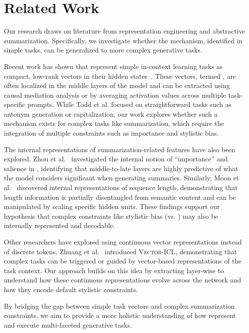 \section{Related Work}
\label{sec:related_work}

Our research draws on literature from representation engineering and abstractive summarization. Specifically, we investigate whether the \newterm{\fv} mechanism, identified in simple \icl tasks, can be generalized to more complex generative tasks.

Recent work has shown that \fvsabbr represent simple in-context learning tasks as compact, low-rank vectors in their hidden states~\cite{todd2023function}. These vectors, termed \newterm{\fvs}, are often localized in the middle layers of the model and can be extracted using causal mediation analysis or by averaging activation values across multiple task-specific prompts. While Todd et al. focused on straightforward tasks such as antonym generation or capitalization, our work explores whether such a mechanism exists for complex tasks like summarization, which require the integration of multiple constraints such as importance and stylistic bias.

The internal representations of summarization-related features have also been explored. Zhou et al.~\cite{zhou2026what} investigated the internal notion of ``importance'' and salience in \fvsabbr, identifying that middle-to-late layers are highly predictive of what the model considers significant when generating summaries. Similarly, Moon et al.~\cite{moon2025length} discovered internal representations of sequence length, demonstrating that length information is partially disentangled from semantic content and can be manipulated by scaling specific hidden units. These findings support our hypothesis that complex constraints like stylistic bias (\extractive vs. \abstractive) may also be internally represented and decodable.

Other researchers have explored \icl using continuous vector representations instead of discrete tokens. Zhuang et al.~\cite{zhuang2024vectoricl} introduced \textsc{Vector-ICL}, demonstrating that complex tasks can be triggered or guided by vector-based representations of the task context. Our approach builds on this idea by extracting layer-wise \fvsabbr to understand how these continuous representations evolve across the network and how they encode default stylistic constraints.

By bridging the gap between simple task vectors and complex summarization constraints, we aim to provide a more holistic understanding of how \fvsabbr represent and execute multi-faceted generative tasks.
